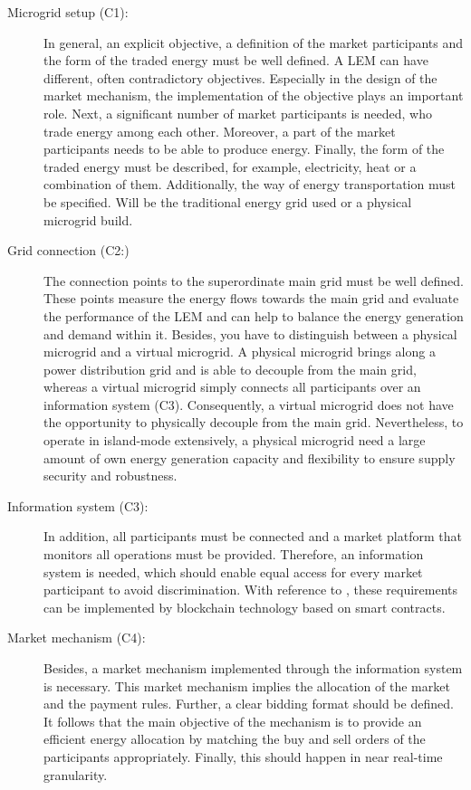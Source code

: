 \begin{description}
    \item[Microgrid setup (C1):] In general, an explicit objective, a definition of the market 
     participants and the form of the traded energy must be well defined. 
     A LEM can have different, often contradictory objectives. Especially in the
     design of the market mechanism, the implementation of the objective plays an important role.
     Next, a significant number of market participants is needed, who trade energy among each other.
     Moreover, a part of the market participants needs to be able to produce energy. 
     Finally, the form of the traded energy must be described, for example, electricity, heat or a 
     combination of them. Additionally, the way of energy transportation must be specified.
     Will be the traditional energy grid used or a physical microgrid build. 
    
    \item[Grid connection (C2:)] The connection points to the superordinate main grid 
     must be well defined. These points measure the energy flows towards the main grid 
     and evaluate the performance of the LEM and can help to balance the energy generation 
     and demand within it. Besides, you have to distinguish between a physical microgrid and 
     a virtual microgrid. A physical microgrid brings along a power distribution grid and is able to
     decouple from the main grid, whereas a virtual microgrid simply connects all participants over 
     an information system (C3). Consequently, a virtual microgrid does not have the opportunity
     to physically decouple from the main grid. 
     Nevertheless, to operate in island-mode extensively, a physical microgrid need a large 
     amount of own energy generation capacity and flexibility to ensure supply security and robustness.
         
    \item[Information system (C3):] In addition, all participants must be connected 
    and a market platform that monitors all operations must be provided. 
    Therefore, an information system is needed, which should enable equal 
    access for every market participant to avoid discrimination. 
    With reference to , these requirements
    can be implemented by blockchain technology based on smart contracts.
    
    \item[Market mechanism (C4):] Besides, a market mechanism implemented through 
     the information system is necessary. This market mechanism implies the allocation of the
     market and the payment rules. Further, a clear bidding format should be defined. 
     It follows that the main objective of the mechanism is to provide an efficient
     energy allocation by matching the buy and sell orders of the participants appropriately.
     Finally, this should happen in near real-time granularity.    
    

\end{description}
